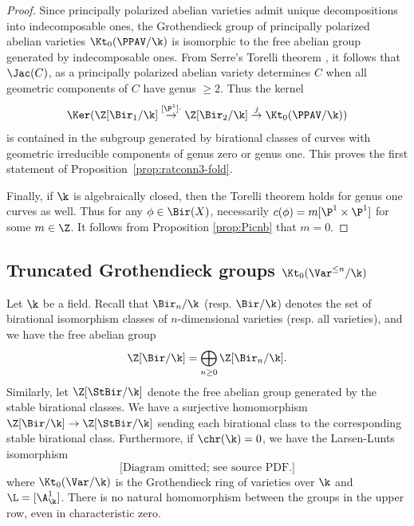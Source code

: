 \begin{proof}
Since principally polarized abelian varieties
admit unique decompositions into indecomposable ones,
the Grothendieck
group of principally
polarized abelian varieties
$\Kt_0(\PPAV/\k)$ is isomorphic to the free abelian group
generated by
indecomposable ones.
From Serre's Torelli theorem \cite[Appendix]{SerreTorelli},
it follows that $\Jac(C)$, as a principally polarized
abelian variety determines $C$ when all geometric components
of $C$ have genus $\ge 2$.
Thus the kernel
\[
\Ker(\Z[\Bir_1/\k] \overset{[\P^1] \cdot}{\to} \Z[\Bir_2/\k]
\overset{j}\to \Kt_0(\PPAV/\k))
\]
is contained in the subgroup generated by
birational classes of
curves with
geometric irreducible components
of genus zero or genus one.
This
proves the first statement of Proposition~\ref{prop:ratconn3-fold}.

Finally, if $\k$ is algebraically closed,
then the Torelli theorem holds
for genus one curves as well. Thus for any
$\phi \in \Bir(X)$,
necessarily
$c(\phi) = m[\P^1 \times \P^1]$ for some $m \in \Z$.
It follows from Proposition \ref{prop:Picnb}
that $m = 0$.
\end{proof}

\subsection{Truncated Grothendieck groups $\Kt_0(\Var^{\le n}/\k)$}\label{ssec-tG0}


Let $\k$ be a field.
Recall that $\Bir_{n}/\k$ (resp. $\Bir/\k$)
denotes the set of birational isomorphism
classes of $n$-dimensional varieties (resp. all varieties),
and we have
the free abelian group
$$\Z[\Bir/\k] = \bigoplus_{n \ge 0} \Z[\Bir_n/\k].$$
Similarly, let $\Z[\StBir/\k]$ denote
the
free abelian group
generated by the stable birational classes.
We have a surjective
homomorphism $\Z[\Bir/\k] \to
\Z[\StBir/\k]$
sending each birational class to the corresponding
stable birational class.
Furthermore, if
$\chr(\k) = 0$, we have the Larsen-Lunts
isomorphism \cite{LarsenLunts}
\[\text{[Diagram omitted; see source PDF.]}
\]
where $\Kt_0(\Var/\k)$ is the Grothendieck ring of varieties over $\k$ and $\L = [\A^1_\k]$.
There is no natural homomorphism
between
the groups in the upper
row, even in characteristic zero.

